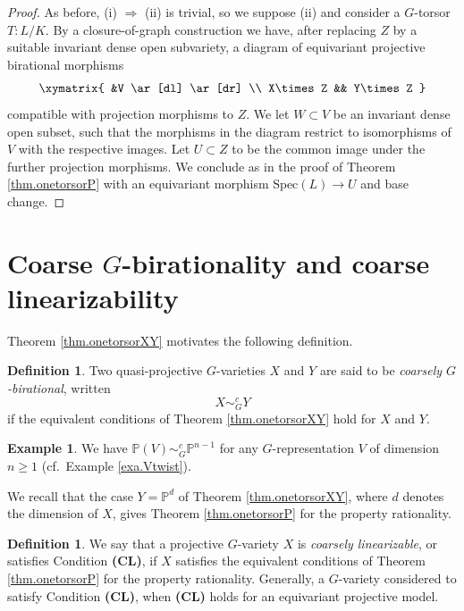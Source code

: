 \documentclass[12pt, reqno]{amsart}
\numberwithin{equation}{section}
\theoremstyle{plain}
\theoremstyle{definition}
\newtheorem{defi}[prop]{Definition}
\newtheorem{exam}[prop]{Example}
\def\bP{{\mathbb P}}
\def\Spec{\mathrm{Spec}}
\begin{document}
\begin{proof}
As before, (i) $\Rightarrow$ (ii) is trivial, so we suppose (ii) and consider a $G$-torsor $T\colon L/K$.
By a closure-of-graph construction we have, after replacing $Z$ by a suitable invariant dense open subvariety, a diagram of equivariant  projective birational morphisms
\[
\xymatrix{
&V \ar[dl] \ar[dr] \\
X\times Z && Y\times Z
}
\]
compatible with projection morphisms to $Z$.
We let $W\subset V$ be an invariant dense open subset, such that the morphisms in the diagram restrict to isomorphisms of $V$ with the respective images.
Let $U\subset Z$ to be the common image under the further projection morphisms.
We conclude as in the proof of Theorem \ref{thm.onetorsorP} with an equivariant morphism $\Spec(L)\to U$ and base change.
\end{proof}









\section{Coarse $G$-birationality and coarse linearizability}
\label{sec.coarse}

Theorem \ref{thm.onetorsorXY} motivates the following definition.

\begin{defi}
\label{def.coarsebirationality}
Two quasi-projective $G$-varieties $X$ and $Y$ are said to be \emph{coarsely $G$-birational}, written
\[ X\sim_G^c Y \]
if the equivalent conditions of Theorem \ref{thm.onetorsorXY} hold for $X$ and $Y$.
\end{defi}

\begin{exam}
\label{exa.cbrep}
We have $\bP(V)\sim_G^c\bP^{n-1}$ for any $G$-representation $V$ of dimension $n\ge 1$ (cf.\ Example \ref{exa.Vtwist}).
\end{exam}

We recall that the case $Y=\bP^d$ of Theorem \ref{thm.onetorsorXY}, where $d$ denotes the dimension of $X$, gives
Theorem \ref{thm.onetorsorP} for the property rationality.

\begin{defi}
\label{def.CL}
We say that a projective $G$-variety $X$ is \emph{coarsely linearizable}, or satisfies Condition \textbf{(CL)}, if $X$ satisfies the equivalent conditions of Theorem \ref{thm.onetorsorP} for the property rationality.
Generally, a $G$-variety considered to satisfy Condition \textbf{(CL)}, when \textbf{(CL)} holds for an equivariant projective model.
\end{defi}
\end{document}
